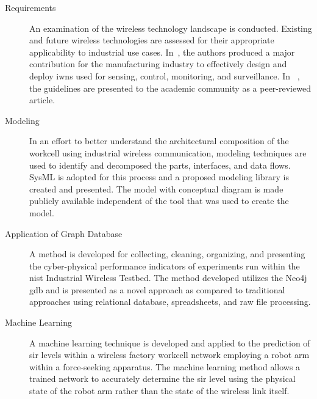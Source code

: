 		\begin{description}
	
	\item[Requirements] \cite{CandellRW2017} \cite{Montgomery2019} \cite{Candell2018.IWSGuide} \cite{ieeeMagazine2018} An examination of the wireless technology landscape is conducted.  Existing and future wireless technologies are assessed for their appropriate applicability to industrial use cases. In~\cite{Candell2018.IWSGuide}, the authors produced a major contribution for the manufacturing industry to effectively design and deploy \glspl{iwn} used for sensing, control, monitoring, and surveillance.  In ~\cite{ieeeMagazine2018}, the guidelines are presented to the academic community as a peer-reviewed article.
	
	\item[Modeling] \cite{Candell2019ASR.SYSML} \cite{Candell2018SysML.JRES} In an effort to better understand the architectural composition of the workcell using industrial wireless communication, modeling techniques are used to identify and decomposed the parts, interfaces, and data flows.  SysML is adopted for this process and a proposed modeling library is created and presented.  The model with conceptual diagram is made publicly available independent of the tool that was used to create the model.
	
	\item[Application of Graph Database] \cite{CandellISIT2020.Conf} \cite{GraphDB.JCISE.Journal} A method is developed for collecting, cleaning, organizing, and presenting the cyber-physical performance indicators of experiments run within the \gls{nist} Industrial Wireless Testbed. The method developed utilizes the Neo4j \gls{gdb} and is presented as a novel approach as compared to traditional approaches using relational database, spreadsheets, and raw file processing.
	
	\item[Machine Learning] \cite{CandellISIE2019.Conf} \cite{Candell2020.Jrnl.ISATrans} A machine learning technique is developed and applied to the prediction of \gls{sir} levels within a wireless factory workcell network employing a robot arm within a force-seeking apparatus.  The machine learning method allows a trained network to accurately determine the \gls{sir} level using the physical state of the robot arm rather than the state of the wireless link itself.
	
\end{description}

